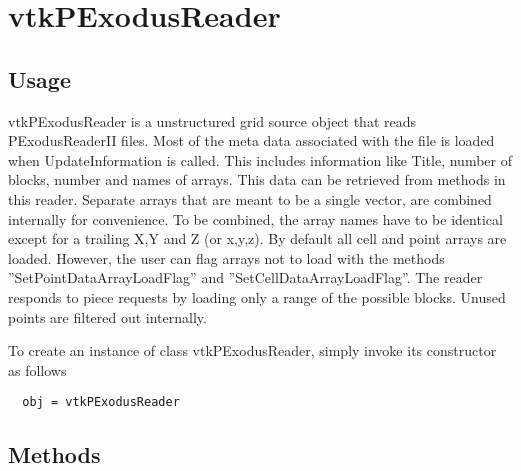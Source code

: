 \section{vtkPExodusReader}

\subsection{Usage}

 vtkPExodusReader is a unstructured grid source object that reads
 PExodusReaderII files. Most of the meta data associated with the
 file is loaded when UpdateInformation is called. This includes
 information like Title, number of blocks, number and names of
 arrays. This data can be retrieved from methods in this
 reader. Separate arrays that are meant to be a single vector, are
 combined internally for convenience. To be combined, the array
 names have to be identical except for a trailing X,Y and Z (or
 x,y,z). By default all cell and point arrays are loaded. However,
 the user can flag arrays not to load with the methods
 ''SetPointDataArrayLoadFlag'' and ''SetCellDataArrayLoadFlag''. The
 reader responds to piece requests by loading only a range of the
 possible blocks. Unused points are filtered out internally.

To create an instance of class vtkPExodusReader, simply
invoke its constructor as follows
\begin{verbatim}
  obj = vtkPExodusReader
\end{verbatim}
\subsection{Methods}

